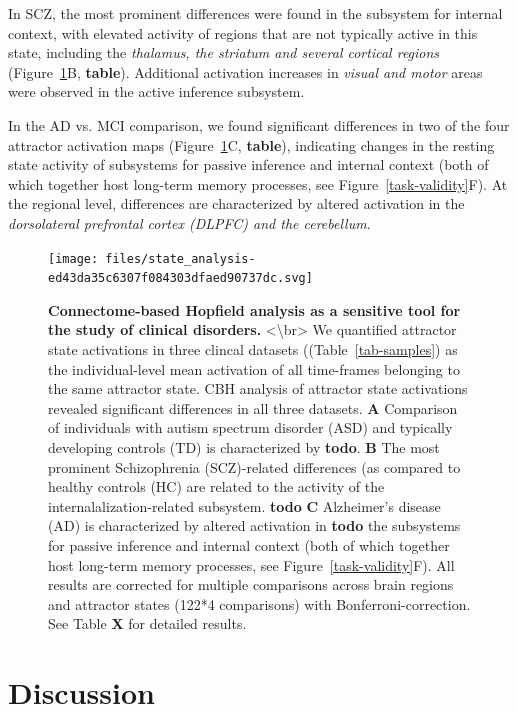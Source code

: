 \documentclass{article}
\begin{document}
In SCZ, the most prominent differences were found in the subsystem for internal context, with elevated activity of
regions that are not typically active in this state, including the \textit{thalamus, the striatum and several cortical regions}
(Figure~\ref{clinical-validity}B, \textbf{table}). Additional activation increases in \textit{visual and motor} areas were observed in
the active inference subsystem.

In the AD vs. MCI comparison, we found significant differences in two of the four attractor activation maps
(Figure~\ref{clinical-validity}C, \textbf{table}), indicating changes in the resting state activity of subsystems for passive
inference and internal context (both of which together host long-term memory processes, see Figure~\ref{task-validity}F).
At the regional level, differences are characterized by altered activation in the \textit{dorsolateral prefrontal cortex
(DLPFC) and the cerebellum}.

\begin{figure}[!htbp]
\centering
\texttt{[image: files/state\_analysis-ed43da35c6307f084303dfaed90737dc.svg]}
\caption[]{\textbf{Connectome-based Hopfield analysis as a sensitive tool for the study of clinical disorders.} \newline
\textless {\textbackslash}br\textgreater 
We quantified attractor state activations in three clincal datasets ((Table~\ref{tab-samples}) as the
individual-level mean activation of all time-frames belonging to the same attractor state. CBH analysis of attractor
state activations revealed significant differences in all three datasets.
\textbf{A} Comparison of individuals with autism spectrum disorder (ASD) and typically developing controls (TD) is
characterized by \textbf{todo}.
\textbf{B} The most prominent Schizophrenia (SCZ)-related differences (as compared to healthy controls (HC) are related to
the activity of the internalalization-related subsystem. \textbf{todo}
\textbf{C} Alzheimer's disease (AD) is characterized by altered activation in \textbf{todo} the subsystems for passive inference
and internal context (both of which together host long-term memory processes, see Figure~\ref{task-validity}F). All
results are corrected for multiple comparisons across brain regions and attractor states (122*4 comparisons)
with Bonferroni-correction. See Table \textbf{X} for detailed results.}
\label{clinical-validity}
\end{figure}

\section{Discussion}\label{Discussion}
\end{document}
